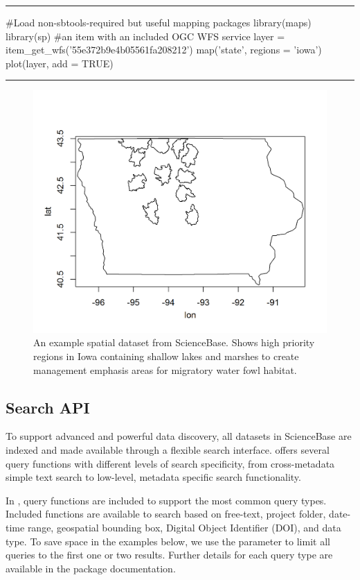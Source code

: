 \noindent\rule{\textwidth}{0.4pt}
\begin{example}
#Load non-sbtools-required but useful mapping packages
library(maps)
library(sp)
#an item with an included OGC WFS service
layer = item_get_wfs('55e372b9e4b05561fa208212')
map('state', regions = 'iowa')
plot(layer, add = TRUE)
\end{example}
\noindent\rule{\textwidth}{0.4pt}

 \begin{figure}[htbp]
   \centering
   \includegraphics{mapfig}
   \caption{An example spatial dataset from ScienceBase. 
   Shows high priority regions in Iowa containing shallow
   lakes and marshes to create management emphasis areas 
   for migratory water fowl habitat.}
   \label{figure:iowafig}
 \end{figure}


\subsection{Search API}
To support advanced and powerful data discovery, all datasets
in ScienceBase are indexed and made available through a flexible
search interface.  offers several query
functions with different levels of search specificity, from
cross-metadata simple text search to low-level, metadata specific search
functionality.

In , query functions are included to support the most common query types. 
Included functions are available to search based on free-text, project folder, 
date-time range, geospatial
bounding box, Digital Object Identifier (DOI), and data type. To save space in
the examples below, we use the  parameter to limit all queries to
the first one or two results. Further details for each query type are available in the
package documentation.


